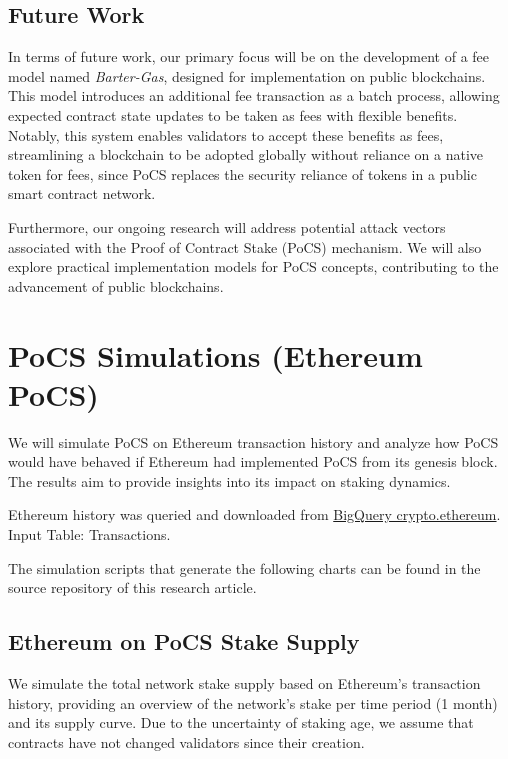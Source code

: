 \documentclass{article}
\begin{document}
\subsection{Future Work}

In terms of future work, our primary focus will be on the development of a fee model named \textit{Barter-Gas}, designed for implementation on public blockchains. This model introduces an additional fee transaction as a batch process, allowing expected contract state updates to be taken as fees with flexible benefits. Notably, this system enables validators to accept these benefits as fees, streamlining a blockchain to be adopted globally without reliance on a native token for fees, since PoCS replaces the security reliance of tokens in a public smart contract network.

Furthermore, our ongoing research will address potential attack vectors associated with the Proof of Contract Stake (PoCS) mechanism. We will also explore practical implementation models for PoCS concepts, contributing to the advancement of public blockchains.

\section{PoCS Simulations (Ethereum PoCS)}

We will simulate PoCS on Ethereum transaction history and analyze how PoCS would have behaved if Ethereum had implemented PoCS from its genesis block. The results aim to provide insights into its impact on staking dynamics.

Ethereum history was queried and downloaded from \href{https://bigquery.cloud.google.com/dataset/bigquery-public-data:crypto_ethereum}{BigQuery crypto.ethereum}. Input Table: Transactions.

The simulation scripts that generate the following charts can be found in the source repository of this research article.

\subsection{Ethereum on PoCS Stake Supply}

We simulate the total network stake supply based on Ethereum's transaction history, providing an overview of the network's stake per time period (1 month) and its supply curve. Due to the uncertainty of staking age, we assume that contracts have not changed validators since their creation.
\end{document}
